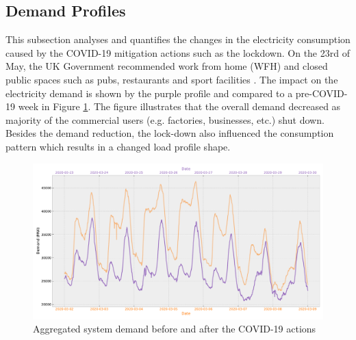 \documentclass[energies,article,submit,moreauthors,pdftex]{Definitions/mdpi}
\begin{document}


\subsection{Demand Profiles}\label{section: Effect on demand profile}

This subsection analyses and quantifies the changes in the electricity consumption caused by the COVID-19 mitigation actions such as the lockdown. On the 23rd of May, the UK Government recommended work from home (WFH) and closed public spaces such as pubs, restaurants and sport facilities \cite{GovernmentGOV.UK}. The impact on the electricity demand is shown by the purple profile and compared to a pre-COVID-19 week in Figure \ref{fig:demand_profiles}. The figure illustrates that the overall demand decreased as majority of the commercial users (e.g. factories, businesses, etc.) shut down.
Besides the demand reduction, the lock-down also influenced the consumption pattern which results in a changed load profile shape.

\begin{figure}[H]
\centering
\hspace{-25pt}\includegraphics[width=15 cm]{Graphics/Demand_profiles.pdf}
\caption{Aggregated system demand before and after the COVID-19 actions}\label{fig:demand_profiles}
\end{figure}  
\end{document}
